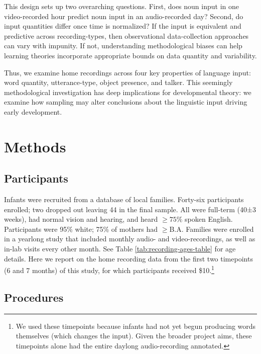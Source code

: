 \documentclass[man]{apa6}
\theoremstyle{definition}
\theoremstyle{definition}
\theoremstyle{definition}
\theoremstyle{remark}
\begin{document}
This design sets up two overarching questions. First, does noun input in
one video-recorded hour predict noun input in an audio-recorded day?
Second, do input quantities differ once time is normalized? If the input
is equivalent and predictive across recording-types, then observational
data-collection approaches can vary with impunity. If not, understanding
methodological biases can help learning theories incorporate appropriate
bounds on data quantity and variability.

Thus, we examine home recordings across four key properties of language
input: word quantity, utterance-type, object presence, and talker. This
seemingly methodological investigation has deep implications for
developmental theory: we examine how sampling may alter conclusions
about the linguistic input driving early development.

\hypertarget{methods}{%
\section{Methods}\label{methods}}

\hypertarget{participants}{%
\subsection{Participants}\label{participants}}

Infants were recruited from a database of local families. Forty-six
participants enrolled; two dropped out leaving 44 in the final sample.
All were full-term (40±3 weeks), had normal vision and hearing, and
heard \(\geq 75\%\) spoken English. Participants were 95\% white; 75\%
of mothers had \(\geq\)B.A. Families were enrolled in a yearlong study
that included monthly audio- and video-recordings, as well as in-lab
visits every other month. See Table \ref{tab:recording-ages-table} for
age details. Here we report on the home recording data from the first
two timepoints (6 and 7 months) of this study, for which participants
received
\$10.\footnote{We used these timepoints because infants had not yet begun producing words themselves (which changes the input). Given the broader project aims, these timepoints alone had the entire daylong audio-recording annotated.}

\hypertarget{procedures}{%
\subsection{Procedures}\label{procedures}}
\end{document}
